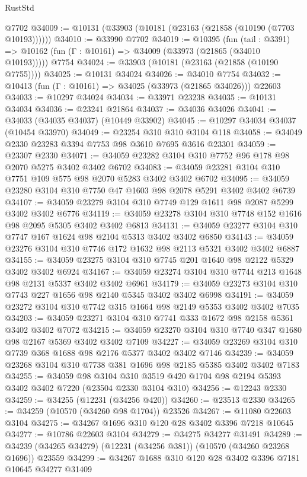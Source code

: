 \begin{lexlean}{RustStd}
\begin{coremodule}
    @7702
@34009 := @10131 (@33903 (@10181 (@23163 (@21858 (@10190 (@7703 @10193))))))
@34010 := @33990 @7702
@34019 := @10395
    (fun (tail : @3391) => @10162 (fun (Γ : @10161) => @34009 (@33973 (@21865 (@34010 @10193)))))
    @7754
@34024 := @33903 (@10181 (@23163 (@21858 (@10190 @7755))))
@34025 := @10131 @34024
@34026 := @34010 @7754
@34032 := @10413 (fun (Γ : @10161) => @34025 (@33973 (@21865 @34026))) @22603
@34033 := @10297 @34024
@34034 := @33971 @23238
@34035 := @10131 @34034
@34036 := @23241 @21864
@34037 := @34036 @34026
@34041 := @34033 (@34035 @34037) (@10449 @33902)
@34045 := @10297 @34034 @34037 (@10454 @33970)
@34049 := @23254 @310 @310 @3104 @118
@34058 := @34049 @2330 @23283 @3394 @7753 @98 @3610 @7695 @3616 @23301
@34059 := @23307 @2330
@34071 := @34059 @23282 @3104 @310 @7752 @96 @178 @98 @2070 @5275 @3402 @3402 @6702
@34083 := @34059 @23281 @3104 @310 @7751 @109 @575 @98 @2070 @5283 @3402 @3402 @6702
@34095 := @34059 @23280 @3104 @310 @7750 @47 @1603 @98 @2078 @5291 @3402 @3402 @6739
@34107 := @34059 @23279 @3104 @310 @7749 @129 @1611 @98 @2087 @5299 @3402 @3402 @6776
@34119 := @34059 @23278 @3104 @310 @7748 @152 @1616 @98 @2095 @5305 @3402 @3402 @6813
@34131 := @34059 @23277 @3104 @310 @7747 @167 @1624 @98 @2104 @5313 @3402 @3402 @6850
@34143 := @34059 @23276 @3104 @310 @7746 @172 @1632 @98 @2113 @5321 @3402 @3402 @6887
@34155 := @34059 @23275 @3104 @310 @7745 @201 @1640 @98 @2122 @5329 @3402 @3402 @6924
@34167 := @34059 @23274 @3104 @310 @7744 @213 @1648 @98 @2131 @5337 @3402 @3402 @6961
@34179 := @34059 @23273 @3104 @310 @7743 @227 @1656 @98 @2140 @5345 @3402 @3402 @6998
@34191 := @34059 @23272 @3104 @310 @7742 @315 @1664 @98 @2149 @5353 @3402 @3402 @7035
@34203 := @34059 @23271 @3104 @310 @7741 @333 @1672 @98 @2158 @5361 @3402 @3402 @7072
@34215 := @34059 @23270 @3104 @310 @7740 @347 @1680 @98 @2167 @5369 @3402 @3402 @7109
@34227 := @34059 @23269 @3104 @310 @7739 @368 @1688 @98 @2176 @5377 @3402 @3402 @7146
@34239 := @34059 @23268 @3104 @310 @7738 @381 @1696 @98 @2185 @5385 @3402 @3402 @7183
@34255 := @34059
    @98
    @3104
    @310
    @3519
    @420
    @1704
    @98
    @2194
    @5393
    @3402
    @3402
    @7220
    (@23504 @2330 @3104 @310)
@34256 := @12243 @2330
@34259 := @34255 (@12231 (@34256 @420))
@34260 := @23513 @2330
@34265 := @34259 (@10570 (@34260 @98 @1704)) @23526
@34267 := @11080 @22603 @3104
@34275 := @34267 @1696 @310 @120 @28 @3402 @3396 @7218 @10645
@34277 := @10786 @22603 @3104
@34279 := @34275 @34277 @31491
@34289 := @34239 (@34265 @34279) (@12231 (@34256 @381)) (@10570 (@34260 @23268 @1696)) @23559
@34299 := @34267 @1688 @310 @120 @28 @3402 @3396 @7181 @10645 @34277 @31409

\end{coremodule}
\end{lexlean}
